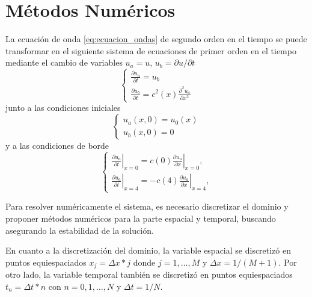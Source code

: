 \documentclass[aps,prb,twocolumn,superscriptaddress,floatfix,longbibliography,10pt]{revtex4-2}
\newcounter{para}
\begin{document}
\section{Métodos Numéricos}

La ecuación de onda \ref{eq:ecuacion_ondas} de segundo orden en el tiempo se puede transformar en el siguiente sistema de ecuaciones de primer orden en el tiempo mediante el cambio de variables $u_a = u$, $u_b = \partial u /\partial t$
\[
  \left \{ \begin{matrix}
     \frac{\partial u_a}{\partial t} = u_b   \\
     \frac{\partial u_b}{\partial t} = c^2(x) \frac{\partial^2 u_a}{\partial x^2}
  \end{matrix} \right .
  \]
junto a las condiciones iniciales
\[ \left \{ \begin{matrix}
     u_a(x,0) = u_0(x) \\
     u_b(x,0) = 0
  \end{matrix} \right .
\]  
y a las condiciones de borde
\[
  \left \{ \begin{matrix}
     \left . \frac{\partial u_a}{\partial t} \right |_{x=0} = c(0) \left . \frac{\partial u_a}{\partial x} \right |_{x=0} ,\\
     \left . \frac{\partial u_a}{\partial t} \right |_{x=4} = - c(4) \left . \frac{\partial u_a}{\partial x} \right |_{x=4},
  \end{matrix} \right .
\]

Para resolver numéricamente el sistema, es necesario discretizar el dominio y proponer métodos numéricos para la parte espacial y temporal, buscando asegurando la estabilidad de la solución.

En cuanto a la discretización del dominio, la variable espacial se discretizó en puntos equiespaciados $x_j = \Delta x * j$ donde $j = 1,\dots,M$ y $\Delta x = 1/(M+1)$. Por otro lado, la variable temporal también se discretizó en puntos equiespaciados $t_n = \Delta t * n$ con $n = 0,1,\dots,N$ y $\Delta t = 1/N$.
\end{document}
